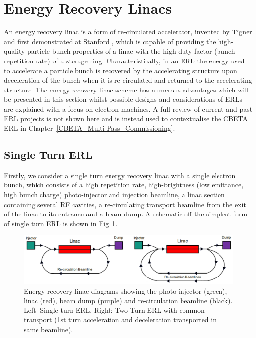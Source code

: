 \documentclass[../main.tex]{subfiles}
\begin{document}
\section{Energy Recovery Linacs}

An energy recovery linac is a form of re-circulated accelerator, invented by Tigner \cite{tigner1965possible} and first demonstrated at Stanford \cite{smith1987development}, which is capable of providing the high-quality particle bunch properties of a linac with the high duty factor (bunch repetition rate) of a storage ring. Characteristically, in an ERL the energy used to accelerate a particle bunch is recovered by the accelerating structure upon deceleration of the bunch when it is re-circulated and returned to the accelerating structure. The energy recovery linac scheme has numerous advantages which will be presented in this section whilst possible designs and considerations of ERLs are explained with a focus on electron machines. A full review of current and past ERL projects is not shown here and is instead used to contextualise the CBETA ERL in Chapter~\ref{CBETA_Multi-Pass_Commissioning}. 


\subsection{Single Turn ERL}
\label{sec:single_turn_ERL}

Firstly, we consider a single turn energy recovery linac with a single electron bunch, which consists of a high repetition rate, high-brightness (low emittance, high bunch charge) photo-injector \cite{ben2016superconducting} and injection beamline, a linac section containing several RF cavities, a re-circulating transport beamline from the exit of the linac to its entrance and a beam dump. A schematic off the simplest form of single turn ERL is shown in Fig~\ref{fig:ERL_schematics}. 

\begin{figure}[!h]
\centering
\includegraphics[width=\textwidth]{Figures/Energy_Recovery_Linac_Design/single_multi_turn_ERL.pdf}
\caption{Energy recovery linac diagrams showing the photo-injector (green), linac (red), beam dump (purple) and re-circulation beamline (black). Left: Single turn ERL. Right: Two Turn ERL with common transport (1st turn acceleration and deceleration transported in same beamline). }
\label{fig:ERL_schematics}
\end{figure}
\end{document}
